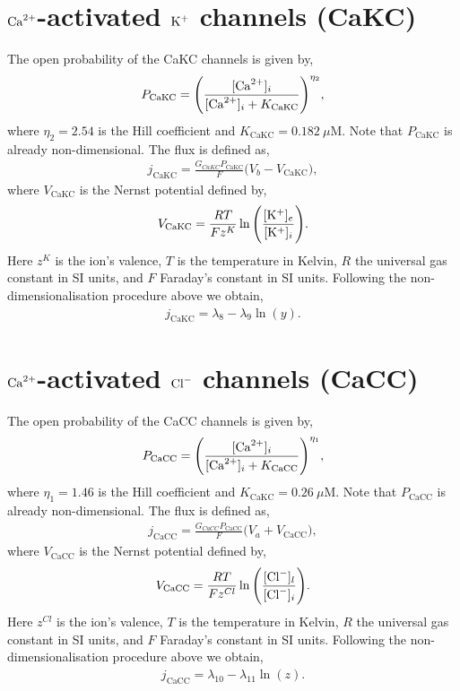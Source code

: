 \documentclass{svjour3}
\newcommand{\ca}{{\rm Ca}^{2+}}
\newcommand{\bc}{[{\rm Ca}^{2+}]_i}
\newcommand{\kplus}{{\rm K}^+}
\newcommand{\bkplus}{[{\rm K}^+]_i}
\newcommand{\cl}{{\rm Cl}^-}
\newcommand{\bcl}{[{\rm Cl}^-]_i}
\newcommand{\blcl}{[{\rm Cl}^-]_l}
\begin{document}
\section*{\Large $\ca$-activated $\kplus$ channels (CaKC)}
The open probability of the CaKC channels is given by,
\begin{align*}
P_{\text{CaKC}}= \Bigg( \frac{\bc}{\bc+K_{\text{CaKC}} } \Bigg)^{\eta_2},
\end{align*}
where $\eta_2=2.54$ is the Hill coefficient and $K_{\text{CaKC}}=0.182 \ \mu \text{M}$. Note that $P_{\text{CaKC}}$ is already non-dimensional. The flux is defined as,
\begin{align*}
j_{\text{CaKC}}=\frac{G_{CaKC}P_{\text{CaKC}}}{F}\Big( V_{b}-V_{\text{CaKC}} \Big),
\end{align*}
where $V_{\text{CaKC}}$ is the Nernst potential defined by,
\begin{align*}
V_{\text{CaKC}} =\frac{RT}{Fz^K}\ln \Bigg(\frac{[\kplus]_e}{\bkplus} \Bigg).
\end{align*}
Here $z^K$ is the ion's valence, $T$ is the temperature in Kelvin, $R$ the universal gas constant in SI units, and $F$ Faraday's constant in SI units. Following the non-dimensionalisation procedure above we obtain,
\begin{align}
j_{\text{CaKC}}=\lambda_8-\lambda_9 \ln(y).
\end{align}

\section*{\Large $\ca$-activated $\cl$ channels (CaCC)}
The open probability of the CaCC channels is given by,
\begin{align*}
P_{\text{CaCC}}= \Bigg( \frac{\bc}{\bc+K_{\text{CaCC}} } \Bigg)^{\eta_1},
\end{align*}
where $\eta_1=1.46$ is the Hill coefficient and $K_{\text{CaKC}}=0.26 \ \mu \text{M}$. Note that $P_{\text{CaCC}}$ is already non-dimensional. The flux is defined as,
\begin{align*}
j_{\text{CaCC}}=\frac{G_{CaCC}P_{\text{CaCC}}}{F}\Big( V_{a}+V_{\text{CaCC}} \Big),
\end{align*}
where $V_{\text{CaCC}}$ is the Nernst potential defined by,
\begin{align*}
V_{\text{CaCC}} =\frac{RT}{Fz^{Cl}}\ln \Bigg(\frac{\blcl}{\bcl} \Bigg).
\end{align*}
Here $z^{Cl}$ is the ion's valence, $T$ is the temperature in Kelvin, $R$ the universal gas constant in SI units, and $F$ Faraday's constant in SI units. Following the non-dimensionalisation procedure above we obtain,
\begin{align}
j_{\text{CaCC}}=\lambda_{10}-\lambda_{11} \ln(z).
\end{align}
\end{document}
